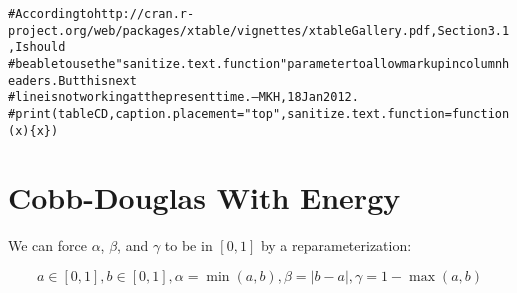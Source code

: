 \documentclass[preprint,authoryear,12pt]{elsarticle}\usepackage{graphicx, color}
\makeatletter
\newcommand{\hlcomment}[1]{\textcolor[rgb]{0.180392156862745,0.6,0.341176470588235}{#1}}%
\newenvironment{kframe}{%
 \def\at@end@of@kframe{}%
 \ifinner\ifhmode%
  \def\at@end@of@kframe{\end{minipage}}%
  \begin{minipage}{\columnwidth}%
 \fi\fi%
 \def\FrameCommand##1{\hskip\@totalleftmargin \hskip-\fboxsep
 \colorbox{shadecolor}{##1}\hskip-\fboxsep
     \hskip-\linewidth \hskip-\@totalleftmargin \hskip\columnwidth}%
 \MakeFramed {\advance\hsize-\width
   \@totalleftmargin\z@ \linewidth\hsize
   \@setminipage}}%
 {\par\unskip\endMakeFramed%
 \at@end@of@kframe}
\makeatother
\begin{document}
\begin{kframe}\begin{alltt}
\hlcomment{# According to http://cran.r-project.org/web/packages/xtable/vignettes/xtableGallery.pdf, Section 3.1, I should }
\hlcomment{# be able to use the "sanitize.text.function" parameter to allow markup in column headers. But this next}
\hlcomment{# line is not working at the present time. --MKH, 18 Jan 2012.}
\hlcomment{# print(tableCD, caption.placement="top", sanitize.text.function = function(x)\{x\})}
\end{alltt}
\end{kframe}


\section{Cobb-Douglas With Energy}

We can force $\alpha$, $\beta$, and $\gamma$ to be in $[0,1]$ by a reparameterization:

\[ a \in[0,1], b \in [0,1], \alpha=\min(a,b), \beta=|b-a|, \gamma = 1-\max(a,b) \]
\end{document}
